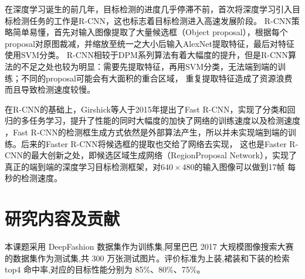 在深度学习诞生的前几年，目标检测的进度几乎停滞不前，首次将深度学习引入目标检测任务的工作是R-CNN\cite{girshick2014rich}，这也标志着目标检测进入高速发展阶段。
R-CNN策略简单易懂，首先对输入图像提取了大量候选框（Object proposal），根据每个proposal对原图裁减，并缩放至统一之大小后输入AlexNet提取特征，最后对特征使用SVM分类。
R-CNN相较于DPM系列算法有着大幅度的提升，但是R-CNN算法的不足之处也较为明显：需要先提取特征，再用SVM分类，无法端到端的训练；不同的proposal可能会有大面积的重合区域，
重复提取特征造成了资源浪费而且导致检测速度较慢。


在R-CNN的基础上，Girshick等人于2015年提出了Fast R-CNN\cite{girshick2015fast}，实现了分类和回归的多任务学习，提升了性能的同时大幅度的加快了网络的训练速度以及检测速度
，Fast R-CNN的检测框生成方式依然是外部算法产生，所以并未实现端到端的训练。后来的Faster R-CNN\cite{ren2015faster}将候选框的提取也交给了网络去实现，
这也是Faster R-CNN的最大创新之处，即候选区域生成网络（RegionProposal Network），实现了真正的端到端的深度学习目标检测框架，对$640 \times 480$的输入图像可以做到17帧
每秒的检测速度。


\section{研究内容及贡献}
本课题采用 DeepFashion\cite{liu2016deepfashion} 数据集作为训练集,阿里巴巴 2017 大规模图像搜索大赛
的数据集作为测试集,共 300 万张测试图片。评价标准为上装,裙装和下装的检索 top4
命中率,对应的目标性能分别为 85\%、80\%、75\%。

